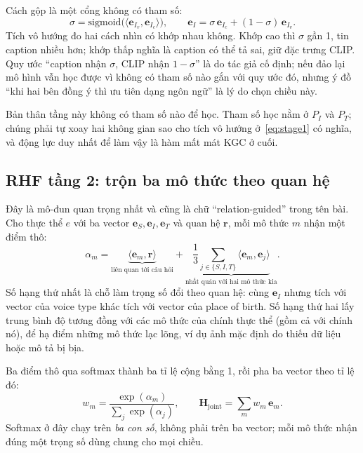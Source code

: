 \documentclass[conference,a4paper]{IEEEtran}
\newcommand{\Hj}{\mathbf{H}_{\mathrm{joint}}}
\begin{document}
Cách gộp là một cổng không có tham số:
\begin{equation}
\sigma = \mathrm{sigmoid}\big(\langle \mathbf{e}_{I_v}, \mathbf{e}_{I_c}\rangle\big), \qquad
\mathbf{e}_I = \sigma\,\mathbf{e}_{I_c} + (1-\sigma)\,\mathbf{e}_{I_v}.
\label{eq:stage1}
\end{equation}
Tích vô hướng đo hai cách nhìn có khớp nhau không. Khớp cao thì $\sigma$ gần 1, tin caption nhiều hơn; khớp thấp nghĩa là caption có thể tả sai, giữ đặc trưng CLIP. Quy ước ``caption nhận $\sigma$, CLIP nhận $1-\sigma$'' là do tác giả cố định; nếu đảo lại mô hình vẫn học được vì không có tham số nào gắn với quy ước đó, nhưng ý đồ ``khi hai bên đồng ý thì ưu tiên dạng ngôn ngữ'' là lý do chọn chiều này.

Bản thân tầng này không có tham số nào để học. Tham số học nằm ở $P_I$ và $P_T$; chúng phải tự xoay hai không gian sao cho tích vô hướng ở~\eqref{eq:stage1} có nghĩa, và động lực duy nhất để làm vậy là hàm mất mát KGC ở cuối.

\subsection{RHF tầng 2: trộn ba mô thức theo quan hệ}
\label{sec:hfr-stage2}

Đây là mô-đun quan trọng nhất và cũng là chữ ``relation-guided'' trong tên bài. Cho thực thể $e$ với ba vector $\mathbf{e}_S, \mathbf{e}_I, \mathbf{e}_T$ và quan hệ $\mathbf{r}$, mỗi mô thức $m$ nhận một điểm thô:
\begin{equation}
\alpha_m = \underbrace{\langle \mathbf{e}_m, \mathbf{r}\rangle}_{\text{liên quan tới câu hỏi}}
 + \underbrace{\frac{1}{3}\sum_{j \in \{S,I,T\}} \langle \mathbf{e}_m, \mathbf{e}_j\rangle}_{\text{nhất quán với hai mô thức kia}}.
\label{eq:alpha}
\end{equation}
Số hạng thứ nhất là chỗ làm trọng số đổi theo quan hệ: cùng $\mathbf{e}_I$ nhưng tích với vector của voice type khác tích với vector của place of birth. Số hạng thứ hai lấy trung bình độ tương đồng với các mô thức của chính thực thể (gồm cả với chính nó), để hạ điểm những mô thức lạc lõng, ví dụ ảnh mặc định do thiếu dữ liệu hoặc mô tả bị bịa.

Ba điểm thô qua softmax thành ba tỉ lệ cộng bằng 1, rồi pha ba vector theo tỉ lệ đó:
\begin{equation}
w_m = \frac{\exp(\alpha_m)}{\sum_j \exp(\alpha_j)}, \qquad
\Hj = \sum_{m} w_m\,\mathbf{e}_m .
\label{eq:hjoint}
\end{equation}
Softmax ở đây chạy trên \emph{ba con số}, không phải trên ba vector; mỗi mô thức nhận đúng một trọng số dùng chung cho mọi chiều.
\end{document}
